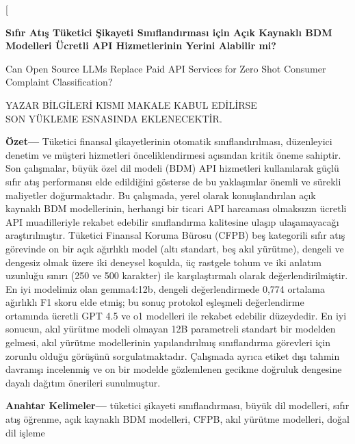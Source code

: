 \documentclass[10pt,a4paper,twocolumn]{article}
\begin{document}
\twocolumn[
\begin{center}
{\bfseries\fontsize{20}{24}\selectfont Sıfır Atış Tüketici Şikayeti Sınıflandırması için Açık Kaynaklı BDM Modelleri Ücretli API Hizmetlerinin Yerini Alabilir mi?\par}
\vspace{0.7em}
{\fontsize{20}{24}\selectfont Can Open Source LLMs Replace Paid API Services for Zero Shot Consumer Complaint Classification?\par}
\vspace{0.8em}
{\fontsize{11}{13}\selectfont YAZAR BİLGİLERİ KISMI MAKALE KABUL EDİLİRSE\\
SON YÜKLEME ESNASINDA EKLENECEKTİR.\par}
\end{center}
\vspace{0.8em}
\begin{minipage}{0.96\textwidth}
\noindent\textbf{Özet---}
Tüketici finansal şikayetlerinin otomatik sınıflandırılması, düzenleyici denetim ve müşteri hizmetleri önceliklendirmesi açısından kritik öneme sahiptir. Son çalışmalar, büyük özel dil modeli (BDM) API hizmetleri kullanılarak güçlü sıfır atış performansı elde edildiğini gösterse de bu yaklaşımlar önemli ve sürekli maliyetler doğurmaktadır. Bu çalışmada, yerel olarak konuşlandırılan açık kaynaklı BDM modellerinin, herhangi bir ticari API harcaması olmaksızın ücretli API muadilleriyle rekabet edebilir sınıflandırma kalitesine ulaşıp ulaşamayacağı araştırılmıştır. Tüketici Finansal Koruma Bürosu (CFPB) beş kategorili sıfır atış görevinde on bir açık ağırlıklı model (altı standart, beş akıl yürütme), dengeli ve dengesiz olmak üzere iki deneysel koşulda, üç rastgele tohum ve iki anlatım uzunluğu sınırı (250 ve 500 karakter) ile karşılaştırmalı olarak değerlendirilmiştir. En iyi modelimiz olan gemma4:12b, dengeli değerlendirmede 0,774 ortalama ağırlıklı F1 skoru elde etmiş; bu sonuç protokol eşleşmeli değerlendirme ortamında ücretli GPT 4.5 ve o1 modelleri ile rekabet edebilir düzeydedir. En iyi sonucun, akıl yürütme modeli olmayan 12B parametreli standart bir modelden gelmesi, akıl yürütme modellerinin yapılandırılmış sınıflandırma görevleri için zorunlu olduğu görüşünü sorgulatmaktadır. Çalışmada ayrıca etiket dışı tahmin davranışı incelenmiş ve on bir modelde gözlemlenen gecikme doğruluk dengesine dayalı dağıtım önerileri sunulmuştur.

\vspace{0.5em}
\noindent\textbf{Anahtar Kelimeler---} tüketici şikayeti sınıflandırması, büyük dil modelleri, sıfır atış öğrenme, açık kaynaklı BDM modelleri, CFPB, akıl yürütme modelleri, doğal dil işleme


\end{minipage}
\end{document}
